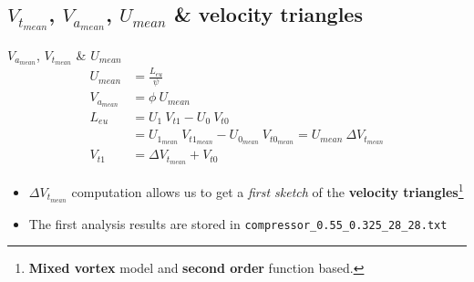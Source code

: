 	\subsection{$V_{t_{mean}}$, $V_{a_{mean}}$, $U_{mean}$ \& velocity triangles}
\begin{frame}[fragile]{$V_{a_{mean}}$, $V_{t_{mean}}$ \& $U_{mean}$}
	\begin{align}
		U_{mean} & = \frac{L_{eu}}{\psi} \nonumber \\ 
		V_{a_{mean}} & = \phi \ U_{mean} \nonumber \\
		L_{eu} & = U_1 \ V_{t1} - U_0 \ V_{t0} \nonumber \\ 
		       & = U_{1_{mean}} \ V_{t1_{mean}} - U_{0_{mean}} \ V_{t0_{mean}} = U_{mean} \ \Delta V_{t_{mean}} \nonumber \\
		V_{t1} & = \Delta V_{t_{mean}} + V_{t0} \nonumber  
	\end{align}
	\begin{itemize}
		\item $\Delta V_{t_{mean}}$ computation allows us to get a \textit{first sketch} of the \textbf{velocity triangles}\footnote{\textbf{Mixed vortex} model and \textbf{second order} function based.}
		\item The first analysis results are stored in \verb|compressor_0.55_0.325_28_28.txt|
	\end{itemize}
\end{frame}
